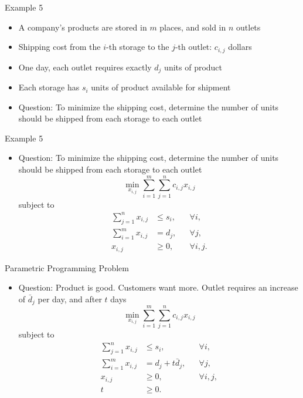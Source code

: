 \documentclass[aspectratio=169,hyperref,UTF8,CJK]{beamer}
\begin{document}
\begin{frame}{Example 5}
  \begin{itemize}
    \item A company's products are stored in $m$ places, and sold in $n$ outlets
    \item Shipping cost from the $i$-th storage to the $j$-th outlet: $c_{i,j}$ dollars
    \item One day, each outlet requires exactly $d_j$ units of product
    \item Each storage has $s_i$ units of product available for shipment
    \item Question: To minimize the shipping cost, determine the number of units should be shipped from each storage to each outlet
  \end{itemize}
\end{frame}

\begin{frame}{Example 5}
  \small
  \begin{itemize}
    \item Question: To minimize the shipping cost, determine the number of units should be shipped from each storage to each outlet
      \begin{equation*}
        \min_{x_{i,j}}\sum_{i=1}^{m}\sum_{j=1}^{n}c_{i,j}x_{i,j}
      \end{equation*}
      subject to
      \begin{align*}
        \sum_{j=1}^{n}x_{i,j}&\le s_i, &&\forall i,\\
        \sum_{i=1}^{m}x_{i,j}&=d_j, &&\forall j,\\
        x_{i,j}&\ge0, &&\forall i,j.
      \end{align*}
  \end{itemize}
\end{frame}

\begin{frame}{Parametric Programming Problem}
  \small
  \begin{itemize}
    \item Question: Product is good. Customers want more. Outlet requires an increase of $\bar d_j$ per day, and after $t$ days
      \begin{equation*}
        \min_{x_{i,j}}\sum_{i=1}^{m}\sum_{j=1}^{n}c_{i,j}x_{i,j}
      \end{equation*}
      subject to
      \begin{align*}
        \sum_{j=1}^{n}x_{i,j}&\le s_i, &&\forall i,\\
        \sum_{i=1}^{m}x_{i,j}&=d_j+t\bar d_j, &&\forall j,\\
        x_{i,j}&\ge0, &&\forall i,j,\\
        t&\ge0.
      \end{align*}
  \end{itemize}
\end{frame}
\end{document}
